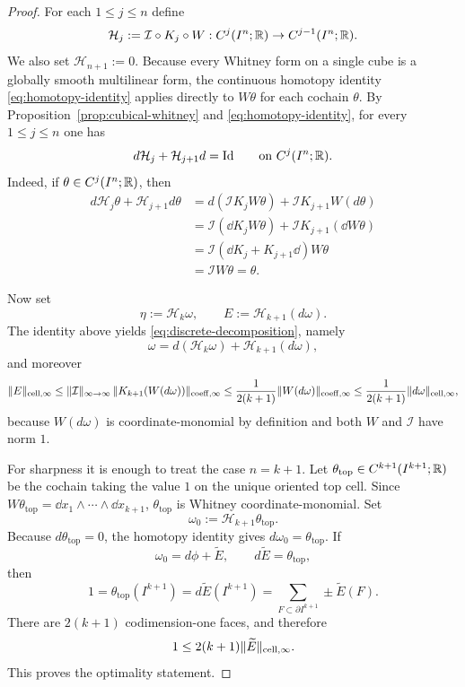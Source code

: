 \begin{proof}
For each $1\le j\le n$ define
\[
\mathcal H_j:=\mathcal I\circ K_j\circ W:
C^j(I^n;\mathbb{R})\to C^{j-1}(I^n;\mathbb{R}).
\]
We also set $\mathcal H_{n+1}:=0$. Because every Whitney form on a single cube is
a globally smooth multilinear form, the continuous homotopy identity
\eqref{eq:homotopy-identity} applies directly to $W\theta$ for each cochain
$\theta$. By Proposition~\ref{prop:cubical-whitney} and
\eqref{eq:homotopy-identity},
for every $1\le j\le n$ one has
\[
d\mathcal H_j+\mathcal H_{j+1}d=\mathrm{Id}
\qquad
\text{on }C^j(I^n;\mathbb{R}).
\]
Indeed, if $\theta\in C^j(I^n;\mathbb{R})$, then
\[
\begin{aligned}
d\mathcal H_j\theta+\mathcal H_{j+1}d\theta
&=
d(\mathcal I K_jW\theta)+\mathcal I K_{j+1}W(d\theta) \\
&=
\mathcal I(\dd K_jW\theta)+\mathcal I K_{j+1}(\dd W\theta) \\
&=
\mathcal I(\dd K_j+K_{j+1}\dd)W\theta \\
&=
\mathcal I W\theta
=
\theta.
\end{aligned}
\]

Now set
\[
\eta:=\mathcal H_k\omega,
\qquad
E:=\mathcal H_{k+1}(d\omega).
\]
The identity above yields \eqref{eq:discrete-decomposition}, namely
\[
\omega=d(\mathcal H_k\omega)+\mathcal H_{k+1}(d\omega),
\]
and moreover
\[
\lVert E \rVert_{\mathrm{cell},\infty}
\le
\lVert \mathcal I \rVert_{\infty\to\infty}\,
\lVert K_{k+1}(W(d\omega)) \rVert_{\mathrm{coeff},\infty}
\le
\frac{1}{2(k+1)}\lVert W(d\omega) \rVert_{\mathrm{coeff},\infty}
\le
\frac{1}{2(k+1)}\lVert d\omega \rVert_{\mathrm{cell},\infty},
\]
because $W(d\omega)$ is coordinate-monomial by definition and both $W$ and
$\mathcal I$ have norm $1$.

For sharpness it is enough to treat the case $n=k+1$. Let
$\theta_{\mathrm{top}}\in C^{k+1}(I^{k+1};\mathbb{R})$ be the cochain taking the value
$1$ on the unique oriented top cell. Since
$W\theta_{\mathrm{top}}=\dd x_1\wedge\cdots\wedge \dd x_{k+1}$,
$\theta_{\mathrm{top}}$ is Whitney coordinate-monomial. Set
\[
\omega_0:=\mathcal H_{k+1}\theta_{\mathrm{top}}.
\]
Because $d\theta_{\mathrm{top}}=0$, the homotopy identity gives
$d\omega_0=\theta_{\mathrm{top}}$. If
\[
\omega_0=d\phi+\widetilde E,
\qquad
d\widetilde E=\theta_{\mathrm{top}},
\]
then
\[
1
=
\theta_{\mathrm{top}}(I^{k+1})
=
d\widetilde E(I^{k+1})
=
\sum_{F\subset\partial I^{k+1}}\pm \widetilde E(F).
\]
There are $2(k+1)$ codimension-one faces, and therefore
\[
1\le 2(k+1)\lVert \widetilde E \rVert_{\mathrm{cell},\infty}.
\]
This proves the optimality statement.
\end{proof}

